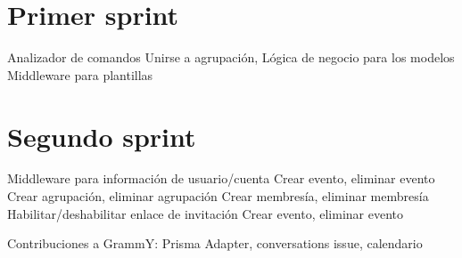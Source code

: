 

\section{Primer sprint}

Analizador de comandos
Unirse a agrupación,
Lógica de negocio para los modelos
Middleware para plantillas


\section{Segundo sprint}

Middleware para información de usuario/cuenta
Crear evento, eliminar evento
Crear agrupación, eliminar agrupación
Crear membresía, eliminar membresía
Habilitar/deshabilitar enlace de invitación
Crear evento, eliminar evento

Contribuciones a GrammY: Prisma Adapter, conversations issue, calendario
